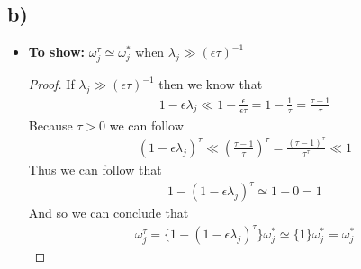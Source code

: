 \documentclass[a4paper]{article}
\begin{document}
    \subsection*{b)}
        \begin{itemize}
            \item \textbf{To show:} $\omega^{\tau}_j \simeq \omega^*_j$ when $\lambda_j \gg (\epsilon\tau)^{-1}$
            \begin{proof}
                If $\lambda_j \gg (\epsilon\tau)^{-1}$ then we know that
                    \begin{align}
                        1-\epsilon\lambda_j \ll 1-\frac{\epsilon}{\epsilon\tau} = 1-\frac{1}{\tau} = \frac{\tau-1}{\tau}
                    \end{align}
                Because $\tau > 0$ we can follow
                    \begin{align}
                        (1-\epsilon\lambda_j)^{\tau} \ll \left(\frac{\tau-1}{\tau}\right)^{\tau} 
                        = \frac{(\tau-1)^{\tau}}{\tau^{\tau}} \ll 1
                    \end{align}
                Thus we can follow that
                    \begin{align}
                        1-(1-\epsilon\lambda_j)^{\tau} \simeq 1-0 = 1
                    \end{align}
                And so we can conclude that
                    \begin{align}
                        \omega^{\tau}_j = \{1 - (1 - \epsilon\lambda_j)^{\tau}\} \omega^{*}_j 
                        \simeq \{1\} \omega^{*}_j = \omega^*_j
                    \end{align}
            \end{proof}


\end{itemize}
\end{document}
